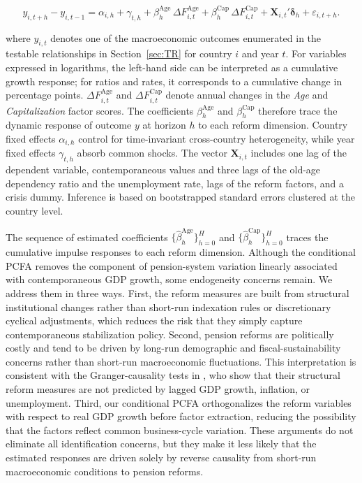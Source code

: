 \documentclass[11pt,english,a4paper, twoside, authoryear]{article}
\begin{document}
\begin{equation}
\label{eq:lp}
y_{i,t+h} - y_{i,t-1} = \alpha_{i,h} + \gamma_{t,h}
+ \beta^{\text{Age}}_h \, \Delta F^{\text{Age}}_{i,t}
+ \beta^{\text{Cap}}_h \, \Delta F^{\text{Cap}}_{i,t}
+ \mathbf{X}_{i,t}' \boldsymbol{\delta}_h
+ \varepsilon_{i,t+h}.
\end{equation}

\noindent where $y_{i,t}$ denotes one of the macroeconomic outcomes enumerated in the testable relationships in Section~\ref{sec:TR} for country $i$ and year $t$. For variables expressed in logarithms, the left-hand side can be interpreted as a cumulative growth response; for ratios and rates, it corresponds to a cumulative change in percentage points. $\Delta F^{\text{Age}}_{i,t}$ and $\Delta F^{\text{Cap}}_{i,t}$ denote annual changes in the \emph{Age} and \emph{Capitalization} factor scores. The coefficients $\beta^{\text{Age}}_h$ and $\beta^{\text{Cap}}_h$ therefore trace the dynamic response of outcome $y$ at horizon $h$ to each reform dimension. Country fixed effects $\alpha_{i,h}$ control for time-invariant cross-country heterogeneity, while year fixed effects $\gamma_{t,h}$ absorb common shocks. The vector $\mathbf{X}_{i,t}$ includes one lag of the dependent variable, contemporaneous values and three lags of the old-age dependency ratio and the unemployment rate, lags of the reform factors, and a crisis dummy. Inference is based on bootstrapped standard errors clustered at the country level.

The sequence of estimated coefficients $\{\hat{\beta}^{\text{Age}}_h\}_{h=0}^{H}$ and $\{\hat{\beta}^{\text{Cap}}_h\}_{h=0}^{H}$ traces the cumulative impulse responses to each reform dimension. Although the conditional PCFA removes the component of pension-system variation linearly associated with contemporaneous GDP growth, some endogeneity concerns remain. We address them in three ways. First, the reform measures are built from structural institutional changes rather than short-run indexation rules or discretionary cyclical adjustments, which reduces the risk that they simply capture contemporaneous stabilization policy. Second, pension reforms are politically costly and tend to be driven by long-run demographic and fiscal-sustainability concerns rather than short-run macroeconomic fluctuations. This interpretation is consistent with the Granger-causality tests in \citet{BiZubairy2023}, who show that their structural reform measures are not predicted by lagged GDP growth, inflation, or unemployment. Third, our conditional PCFA orthogonalizes the reform variables with respect to real GDP growth before factor extraction, reducing the possibility that the factors reflect common business-cycle variation. These arguments do not eliminate all identification concerns, but they make it less likely that the estimated responses are driven solely by reverse causality from short-run macroeconomic conditions to pension reforms.
\end{document}

